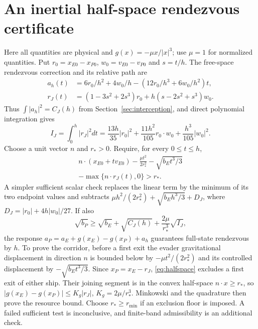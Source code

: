\section{An inertial half-space rendezvous certificate}
\label{app:inertial}
Here all quantities are physical and $g(x)=-\mu x/|x|^3$; use $\mu=1$
for normalized quantities. Put $r_0=x_{E0}-x_{P0}$,
$w_0=v_{E0}-v_{P0}$ and $s=t/h$. The free-space rendezvous correction
and its relative path are
\begin{align}
 a_h(t)&=6r_0/h^2+4w_0/h-(12r_0/h^3+6w_0/h^2)t,\\
 r_J(t)&=(1-3s^2+2s^3)r_0+h(s-2s^2+s^3)w_0.
\end{align}
Thus $\int|a_h|^2=C_J(h)$ from Section~\ref{sec:interception}, and direct
polynomial integration gives
\begin{equation}
 I_J=\int_0^h|r_J|^2dt=
 \frac{13h}{35}|r_0|^2+\frac{11h^2}{105}r_0\cdot w_0
                      +\frac{h^3}{105}|w_0|^2.
\end{equation}
Choose a unit vector $n$ and $r_*>0$. Require, for every $0\le t\le h$,
\begin{equation}
\begin{split}
 n\cdot(x_{E0}+tv_{E0})-\frac{\mu t^2}{2r_*^2}
 -\sqrt{b_Et^3/3}\\
 -\max\{n\cdot r_J(t),0\}>r_*.
\end{split}
\label{eq:halfspace}
\end{equation}
A simpler sufficient scalar check replaces the linear term by the minimum
of its two endpoint values and subtracts
$\mu h^2/(2r_*^2)+\sqrt{b_Eh^3/3}+D_J$, where
$D_J=|r_0|+4h|w_0|/27$.
If also
\begin{equation}
 \sqrt{b_P}\ge\sqrt{b_E}+\sqrt{C_J(h)}
                   +\frac{2\mu}{r_*^3}\sqrt{I_J},
\end{equation}
the response $a_P=a_E+g(x_E)-g(x_P)+a_h$ guarantees full-state
rendezvous by $h$. To prove the corridor, before a first exit the evader
gravitational displacement in direction $n$ is bounded below by
$-\mu t^2/(2r_*^2)$ and its controlled displacement by
$-\sqrt{b_Et^3/3}$. Since $x_P=x_E-r_J$, \eqref{eq:halfspace} excludes
a first exit of either ship. Their joining segment is in the convex
half-space $n\cdot x\ge r_*$, so
$|g(x_E)-g(x_P)|\le K_g|r_J|$, $K_g=2\mu/r_*^3$.
Minkowski and the quadrature then prove the resource bound. Choose
$r_*\ge r_{\min}$ if an exclusion floor is imposed. A failed sufficient
test is inconclusive, and finite-band admissibility is an additional check.

